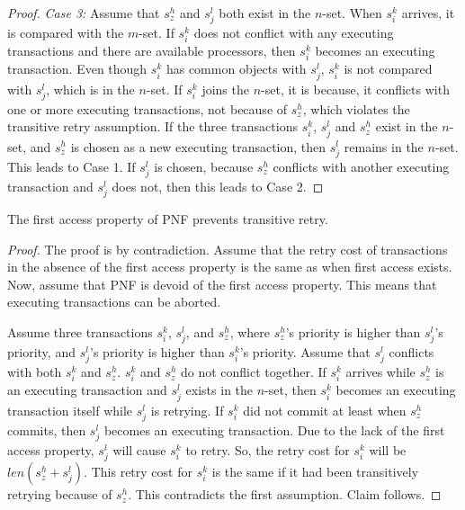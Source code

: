 \begin{proof}
\textit{Case 3:} Assume that $s_{z}^{h}$ and $s_{j}^{l}$ both exist in the $n$-set.
When $s_{i}^{k}$ arrives, it is compared with the $m$-set. If $s_{i}^{k}$ does not conflict with any executing transactions and there are available processors, then $s_{i}^{k}$ becomes an executing transaction. 
Even though $s_{i}^{k}$ has common objects with $s_{j}^{l}$, $s_{i}^{k}$ is not compared with $s_{j}^{l}$, which is in the $n$-set. If $s_{i}^{k}$ joins the $n$-set, it is because, it conflicts with one or more executing transactions, not because of $s_{z}^{h}$, which violates the transitive retry assumption.
If the three transactions $s_i^k$, $s_j^l$ and $s_z^h$ exist in the $n$-set, and  $s_{z}^{h}$ is chosen as a new executing transaction, then $s_{j}^{l}$ remains in the $n$-set. This leads to
Case 1. If $s_{j}^{l}$ is chosen, because $s_{z}^{h}$ conflicts
with another executing transaction and $s_{j}^{l}$ does not, then
this leads to Case 2. 
%
\end{proof}


\begin{clm}\label{first-access}
The first access property of PNF prevents transitive retry.
\end{clm}
\begin{proof}\normalfont
The proof is by contradiction. Assume that the retry cost of transactions
in the absence of the first access property is the same as when first access  exists. Now, assume that PNF is devoid of the first access property.  This means that executing transactions can be aborted. 

Assume three transactions $s_{i}^{k}$, $s_{j}^{l}$, and $s_{z}^{h}$, where $s_{z}^{h}$'s priority is higher than $s_{j}^{l}$'s priority, and $s_j^l$'s priority is higher than $s_{i}^{k}$'s priority. Assume that $s_{j}^{l}$ conflicts with both $s_{i}^{k}$ and $s_{z}^{h}$. 
$s_{i}^{k}$ and $s_{z}^{h}$ do not conflict together. If $s_{i}^{k}$
arrives while $s_{z}^{h}$ is an executing transaction and $s_{j}^{l}$
exists in the $n$-set, then $s_{i}^{k}$ becomes an executing transaction itself while $s_{j}^{l}$ is retrying. If $s_{i}^{k}$ did not commit at least when $s_{z}^{h}$ commits, then $s_{j}^{l}$ becomes an executing transaction. 
Due to the lack of the first access property, $s_{j}^{l}$ will cause $s_{i}^{k}$ to retry. So, the retry cost for $s_{i}^{k}$ will be $len(s_{z}^{h}+s_{j}^{l})$. This
retry cost for $s_{i}^{k}$ is the same if it had been transitively
retrying because of $s_{z}^{h}$. 
This contradicts the first
assumption. Claim follows.
\end{proof}


